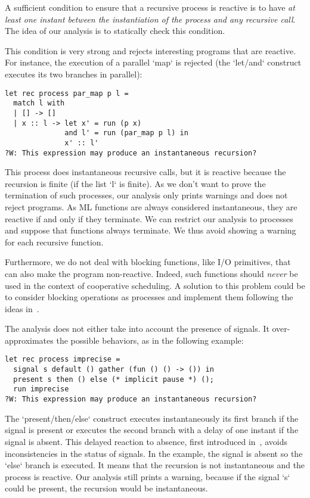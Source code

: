 \documentclass[9pt,preprint]{sigplanconf}
\begin{document}
A sufficient condition to ensure that a recursive process is reactive is to have \emph{at least one instant between the instantiation of the process and any recursive call}. The idea of our analysis is to statically check this condition.

This condition is very strong and rejects interesting programs that are reactive. For instance, the execution of a parallel `map` is rejected (the `let/and` construct executes its two branches in parallel):
\begin{lstlisting}
let rec process par_map p l =
  match l with
  | [] -> []
  | x :: l -> let x' = run (p x)
              and l' = run (par_map p l) in
              x' :: l'
?W: This expression may produce an instantaneous recursion?
\end{lstlisting}
This process does instantaneous recursive calls, but it is reactive because the recursion is finite (if the list `l` is finite). As we don't want to prove the termination of such processes, our analysis only prints warnings and does not reject programs.
As ML functions are always considered instantaneous, they are reactive if and only if they terminate. %
We can restrict our analysis to processes and suppose that functions always terminate.
We thus avoid showing a warning for each recursive function.

Furthermore, we do not deal with blocking functions, like I/O primitives, that can also make the program non-reactive. Indeed, such functions should \emph{never} be used in the context of cooperative scheduling. A solution to this problem could be to consider blocking operations as processes and implement them following the ideas in~\cite{Marlow:2004}.

The analysis does not either take into account the presence of signals. It over-approximates the possible behaviors, as in the following example:
\begin{lstlisting}
let rec process imprecise =
  signal s default () gather (fun () () -> ()) in
  present s then () else (* implicit pause *) ();
  run imprecise
?W: This expression may produce an instantaneous recursion?
\end{lstlisting}
%
The `present/then/else` construct executes instantaneously its first branch if the signal is present or executes the second branch with a delay of one instant if the signal is absent. This delayed reaction to absence, first introduced in~\cite{Boussinot:1991}, avoids inconsistencies in the status of signals. In the example, the signal is absent so the `else` branch is executed. It means that the recursion is not instantaneous and the process is reactive. Our analysis still prints a warning, because if the signal `s` could be present, the recursion would be instantaneous.
\end{document}
